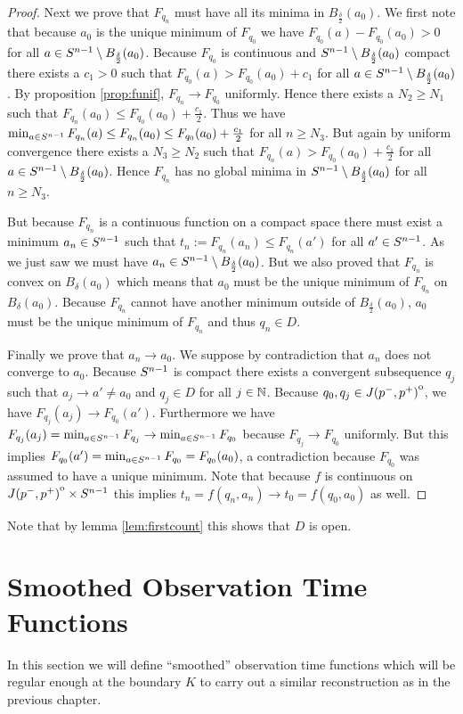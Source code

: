 \begin{proof}
    Next we prove that $F_{q_n}$ must have all its minima in $B_{\frac{\delta}{2}}(a_0)$. We first note that because $a_0$ is the unique minimum of $F_{q_0}$ we have $F_{q_0}(a)-F_{q_0}(a_0)>0$ for all $a\in {S^{n-1}}\setminus B_{\frac{\delta}{2}}(a_0)$. Because $F_{q_0}$ is continuous and ${S^{n-1}}\setminus B_{\frac{\delta}{2}}(a_0)$ compact there exists a $c_1>0$ such that $F_{q_0}(a)> F_{q_0}(a_0) + c_1$ for all $a\in {S^{n-1}}\setminus B_{\frac{\delta}{2}}(a_0)$. By proposition \ref{prop:funif}, $F_{q_n}\to F_{q_0}$ uniformly. Hence there exists a $N_2\ge N_1$ such that $F_{q_n}(a_0)\leq F_{q_0}(a_0)+\frac{c_1}{2}$. Thus we have $\min_{a\in {S^{n-1}}}F_{q_n}(a) \leq F_{q_n}(a_0) \leq F_{q_0}(a_0)+\frac{c_1}{2}$ for all $n\ge N_3$. But again by uniform convergence there exists a $N_3\ge N_2$ such that $F_{q_n}(a) > F_{q_0}(a_0)+\frac{c_1}{2}$ for all $a\in {S^{n-1}}\setminus B_{\frac{\delta}{2}}(a_0)$. Hence $F_{q_n}$ has no global minima in ${S^{n-1}}\setminus B_{\frac{\delta}{2}}(a_0)$ for all $n\ge N_3$.

    But because $F_{q_n}$ is a continuous function on a compact space there must exist a minimum $a_n\in {S^{n-1}}$ such that $t_n:=F_{q_n}(a_n)\leq F_{q_n}(a')$ for all $a'\in {S^{n-1}}$. As we just saw we must have $a_n \in {S^{n-1}}\setminus B_{\frac{\delta}{2}}(a_0)$. But we also proved that $F_{q_n}$ is convex on $B_\delta(a_0)$ which means that $a_0$ must be the unique minimum of $F_{q_n}$ on $B_\delta(a_0)$. Because $F_{q_n}$ cannot have another minimum outside of $B_{\frac{\delta}{2}}(a_0)$, $a_0$ must be the unique minimum of $F_{q_n}$ and thus $q_n \in D$.

    Finally we prove that $a_n\to a_0$. We suppose by contradiction that $a_n$ does not converge to $a_0$. Because ${S^{n-1}}$ is compact there exists a convergent subsequence $q_j$ such that $a_j \to a' \neq a_0$ and $q_j \in D$ for all $j\in \mathbb{N}$. Because $q_0,q_j\in {\kern0ptJ(p^-,p^+)}^{\mathrm{o}}$, we have $F_{q_j}(a_j) \to F_{q_0}(a')$. Furthermore we have $F_{q_j}(a_j)= \min_{a\in {S^{n-1}}}F_{q_j} \to \min_{a\in {S^{n-1}}}F_{q_0}$ because $F_{q_j}\to F_{q_0}$ uniformly. But this implies $F_{q_0}(a') = \min_{a\in {S^{n-1}}}F_{q_0}=F_{q_0}(a_0)$, a contradiction because $F_{q_0}$ was assumed to have a unique minimum. Note that because $f$ is continuous on ${\kern0ptJ(p^-,p^+)}^{\mathrm{o}}\times {S^{n-1}}$ this implies $t_n=f(q_n,a_n)\to t_0 = f(q_0,a_0)$ as well.
\end{proof}
Note that by lemma \ref{lem:firstcount} this shows that $D$ is open.

\section{Smoothed Observation Time Functions}
In this section we will define \enquote{smoothed} observation time functions which will be regular enough at the boundary $K$ to carry out a similar reconstruction as in the previous chapter.

